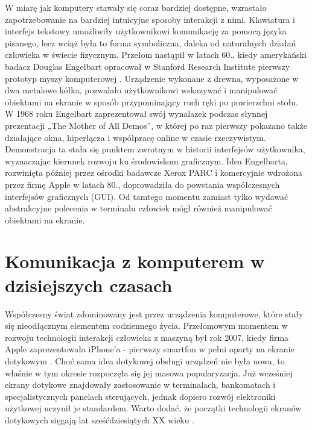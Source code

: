 W miarę jak komputery stawały się coraz bardziej dostępne, wzrastało zapotrzebowanie na bardziej intuicyjne sposoby interakcji z nimi. Klawiatura i interfejs tekstowy umożliwiły użytkownikowi komunikację za pomocą języka pisanego, lecz wciąż była to forma symboliczna, daleka od naturalnych działań człowieka w świecie fizycznym. Przełom nastąpił w latach 60., kiedy amerykański badacz Douglas Engelbart opracował w Stanford Research Institute pierwszy prototyp myszy komputerowej \cite{engelbart1968}. Urządzenie wykonane z drewna, wyposażone w dwa metalowe kółka, pozwalało użytkownikowi wskazywać i manipulować obiektami na ekranie w sposób przypominający ruch ręki po powierzchni stołu. W 1968 roku Engelbart zaprezentował swój wynalazek podczas słynnej prezentacji „The Mother of All Demos”, w której po raz pierwszy pokazano także działające okna, hiperłącza i współpracę online w czasie rzeczywistym. Demonstracja ta stała się punktem zwrotnym w historii interfejsów użytkownika, wyznaczając kierunek rozwoju ku środowiskom graficznym. Idea Engelbarta, rozwinięta później przez ośrodki badawcze Xerox PARC \cite{myers1998} i komercyjnie wdrożona przez firmę Apple w latach 80., doprowadziła do powstania współczesnych interfejsów graficznych (GUI). Od tamtego momentu zamiast tylko wydawać abstrakcyjne polecenia w terminalu człowiek mógł również manipulować obiektami na ekranie.

\section{Komunikacja z komputerem w dzisiejszych czasach}

Współczesny świat zdominowany jest przez urządzenia komputerowe, które stały się nieodłącznym elementem codziennego życia. Przełomowym momentem w rozwoju technologii interakcji człowieka z maszyną był rok 2007, kiedy firma Apple zaprezentowała iPhone'a - pierwszy smartfon w pełni oparty na ekranie dotykowym \cite{isaacson2011}. Choć sama idea dotykowej obsługi urządzeń nie była nowa, to właśnie w tym okresie rozpoczęła się jej masowa popularyzacja. Już wcześniej ekrany dotykowe znajdowały zastosowanie w terminalach, bankomatach i specjalistycznych panelach sterujących, jednak dopiero rozwój elektroniki użytkowej uczynił je standardem. Warto dodać, że początki technologii ekranów dotykowych sięgają lat sześćdziesiątych XX wieku \cite{johnson1965}.

